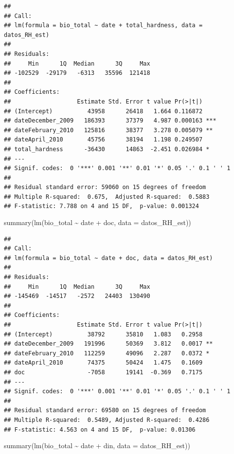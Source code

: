 \documentclass[
]{book}
\newenvironment{Shaded}{\begin{snugshade}}{\end{snugshade}}
\newcommand{\AttributeTok}[1]{\textcolor[rgb]{0.77,0.63,0.00}{#1}}
\newcommand{\FunctionTok}[1]{\textcolor[rgb]{0.00,0.00,0.00}{#1}}
\newcommand{\NormalTok}[1]{#1}
\newcommand{\SpecialCharTok}[1]{\textcolor[rgb]{0.00,0.00,0.00}{#1}}
\begin{document}
\begin{verbatim}
## 
## Call:
## lm(formula = bio_total ~ date + total_hardness, data = datos_RH_est)
## 
## Residuals:
##     Min      1Q  Median      3Q     Max 
## -102529  -29179   -6313   35596  121418 
## 
## Coefficients:
##                   Estimate Std. Error t value Pr(>|t|)    
## (Intercept)          43958      26418   1.664 0.116872    
## dateDecember_2009   186393      37379   4.987 0.000163 ***
## dateFebruary_2010   125816      38377   3.278 0.005079 ** 
## dateApril_2010       45756      38194   1.198 0.249507    
## total_hardness      -36430      14863  -2.451 0.026984 *  
## ---
## Signif. codes:  0 '***' 0.001 '**' 0.01 '*' 0.05 '.' 0.1 ' ' 1
## 
## Residual standard error: 59060 on 15 degrees of freedom
## Multiple R-squared:  0.675,  Adjusted R-squared:  0.5883 
## F-statistic: 7.788 on 4 and 15 DF,  p-value: 0.001324
\end{verbatim}

\begin{Shaded}
\begin{Highlighting}[]
\FunctionTok{summary}\NormalTok{(}\FunctionTok{lm}\NormalTok{(bio\_total }\SpecialCharTok{\textasciitilde{}}\NormalTok{ date }\SpecialCharTok{+}\NormalTok{ doc, }\AttributeTok{data =}\NormalTok{ datos\_RH\_est))}
\end{Highlighting}
\end{Shaded}

\begin{verbatim}
## 
## Call:
## lm(formula = bio_total ~ date + doc, data = datos_RH_est)
## 
## Residuals:
##     Min      1Q  Median      3Q     Max 
## -145469  -14517   -2572   24403  130490 
## 
## Coefficients:
##                   Estimate Std. Error t value Pr(>|t|)   
## (Intercept)          38792      35810   1.083   0.2958   
## dateDecember_2009   191996      50369   3.812   0.0017 **
## dateFebruary_2010   112259      49096   2.287   0.0372 * 
## dateApril_2010       74375      50424   1.475   0.1609   
## doc                  -7058      19141  -0.369   0.7175   
## ---
## Signif. codes:  0 '***' 0.001 '**' 0.01 '*' 0.05 '.' 0.1 ' ' 1
## 
## Residual standard error: 69580 on 15 degrees of freedom
## Multiple R-squared:  0.5489, Adjusted R-squared:  0.4286 
## F-statistic: 4.563 on 4 and 15 DF,  p-value: 0.01306
\end{verbatim}

\begin{Shaded}
\begin{Highlighting}[]
\FunctionTok{summary}\NormalTok{(}\FunctionTok{lm}\NormalTok{(bio\_total }\SpecialCharTok{\textasciitilde{}}\NormalTok{ date }\SpecialCharTok{+}\NormalTok{ din, }\AttributeTok{data =}\NormalTok{ datos\_RH\_est))}
\end{Highlighting}
\end{Shaded}
\end{document}
